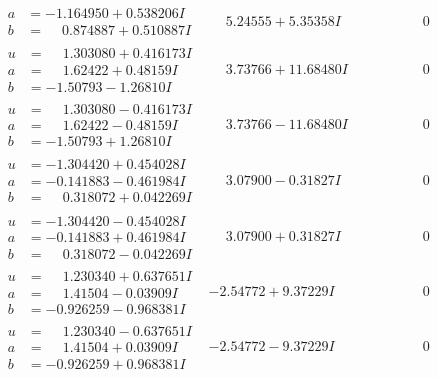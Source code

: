 \documentclass[1p]{elsarticle_modified}
\theoremstyle{definition}
\begin{document}
$$\begin{array}{c|c|c}
\begin{aligned}
a &= -1.164950 + 0.538206 I \\
b &= \phantom{-}0.874887 + 0.510887 I\end{aligned}
 & \phantom{-}5.24555 + 5.35358 I & \phantom{-0.000000 } 0 \\ \hline\begin{aligned}
u &= \phantom{-}1.303080 + 0.416173 I \\
a &= \phantom{-}1.62422 + 0.48159 I \\
b &= -1.50793 - 1.26810 I\end{aligned}
 & \phantom{-}3.73766 + 11.68480 I & \phantom{-0.000000 } 0 \\ \hline\begin{aligned}
u &= \phantom{-}1.303080 - 0.416173 I \\
a &= \phantom{-}1.62422 - 0.48159 I \\
b &= -1.50793 + 1.26810 I\end{aligned}
 & \phantom{-}3.73766 - 11.68480 I & \phantom{-0.000000 } 0 \\ \hline\begin{aligned}
u &= -1.304420 + 0.454028 I \\
a &= -0.141883 - 0.461984 I \\
b &= \phantom{-}0.318072 + 0.042269 I\end{aligned}
 & \phantom{-}3.07900 - 0.31827 I & \phantom{-0.000000 } 0 \\ \hline\begin{aligned}
u &= -1.304420 - 0.454028 I \\
a &= -0.141883 + 0.461984 I \\
b &= \phantom{-}0.318072 - 0.042269 I\end{aligned}
 & \phantom{-}3.07900 + 0.31827 I & \phantom{-0.000000 } 0 \\ \hline\begin{aligned}
u &= \phantom{-}1.230340 + 0.637651 I \\
a &= \phantom{-}1.41504 - 0.03909 I \\
b &= -0.926259 - 0.968381 I\end{aligned}
 & -2.54772 + 9.37229 I & \phantom{-0.000000 } 0 \\ \hline\begin{aligned}
u &= \phantom{-}1.230340 - 0.637651 I \\
a &= \phantom{-}1.41504 + 0.03909 I \\
b &= -0.926259 + 0.968381 I\end{aligned}
 & -2.54772 - 9.37229 I & \phantom{-0.000000 } 0 \\ \hline\begin{aligned}

\end{aligned}
\end{array}$$
\end{document}
